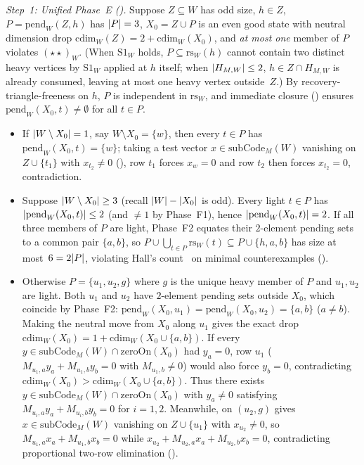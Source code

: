 \begin{outline}
\emph{Step~1: Unified Phase~E ().} Suppose $Z \subseteq W$ has odd size, $h \in Z$, $P = \mathrm{pend}_W(Z, h)$
has $\lvert P \rvert = 3$, $X_0 = Z \cup P$ is an even good state with neutral dimension drop $\mathrm{cdim}_W(Z) = 2 +
\mathrm{cdim}_W(X_0)$, and \emph{at most one} member of $P$ violates $(\star\star)_W$. (When $\mathrm{S1}_W$ holds, $P
\subseteq \mathrm{rs}_W(h)$ cannot contain two distinct heavy vertices by $\mathrm{S1}_W$ applied at $h$ itself; when
$\lvert H_{M,W} \rvert \le 2$, $h \in Z \cap H_{M,W}$ is already consumed, leaving at most one heavy vertex outside~$Z$.) By
recovery-triangle-freeness on $h$, $P$ is independent in $\mathrm{rs}_W$, and immediate closure ()
ensures $\mathrm{pend}_W(X_0, t) \ne \emptyset$ for all $t \in P$.
\begin{itemize}
\item If $\lvert W \setminus X_0 \rvert = 1$, say $W \setminus X_0 = \{w\}$, then every $t \in P$ has $\mathrm{pend}_W(X_0, t) =
  \{w\}$; taking a test vector $x \in \mathrm{subCode}_M(W)$ vanishing on $Z \cup \{t_1\}$ with $x_{t_2} \ne 0$
  (), row $t_1$ forces $x_w = 0$ and row $t_2$ then forces $x_{t_2} = 0$, contradiction.
\item Suppose $\lvert W \setminus X_0 \rvert \ge 3$ (recall $\lvert W \rvert - \lvert X_0 \rvert$ is odd). Every light $t \in P$ has
  $\lvert \mathrm{pend}_W(X_0, t) \rvert \le 2$ (and $\ne 1$ by Phase~F1), hence $\lvert \mathrm{pend}_W(X_0, t) \rvert = 2$. If all three
  members of $P$ are light, Phase~F2 equates their $2$-element pending sets to a common pair $\{a, b\}$, so $P \cup
  \bigcup_{t \in P} \mathrm{rs}_W(t) \subseteq P \cup \{h, a, b\}$ has size at most~$6 = 2 \lvert P \rvert$, violating Hall's
  count~\cite{Hall1935} on minimal counterexamples ().
\item Otherwise $P = \{u_1, u_2, g\}$ where $g$ is the unique heavy member of $P$ and $u_1, u_2$ are light. Both $u_1$ and
  $u_2$ have $2$-element pending sets outside $X_0$, which coincide by Phase~F2: $\mathrm{pend}_W(X_0, u_1) =
  \mathrm{pend}_W(X_0, u_2) = \{a, b\}$ ($a \ne b$). Making the neutral move from $X_0$ along $u_1$ gives the exact drop
  $\mathrm{cdim}_W(X_0) = 1 + \mathrm{cdim}_W(X_0 \cup \{a, b\})$. If every $y \in \mathrm{subCode}_M(W) \cap
  \mathrm{zeroOn}(X_0)$ had $y_a = 0$, row $u_1$ ($M_{u_1, a} y_a + M_{u_1, b} y_b = 0$ with $M_{u_1, b} \ne 0$) would also
  force $y_b = 0$, contradicting $\mathrm{cdim}_W(X_0) > \mathrm{cdim}_W(X_0 \cup \{a, b\})$. Thus there exists $y \in
  \mathrm{subCode}_M(W) \cap \mathrm{zeroOn}(X_0)$ with $y_a \ne 0$ satisfying $M_{u_i, a} y_a + M_{u_i, b} y_b = 0$ for
  $i = 1, 2$. Meanwhile,  on $(u_2, g)$ gives $x \in \mathrm{subCode}_M(W)$ vanishing on
  $Z \cup \{u_1\}$ with $x_{u_2} \ne 0$, so $M_{u_1, a} x_a + M_{u_1, b} x_b = 0$ while $x_{u_2} + M_{u_2, a} x_a +
  M_{u_2, b} x_b = 0$, contradicting proportional two-row elimination ().
\end{itemize}


\end{outline}
